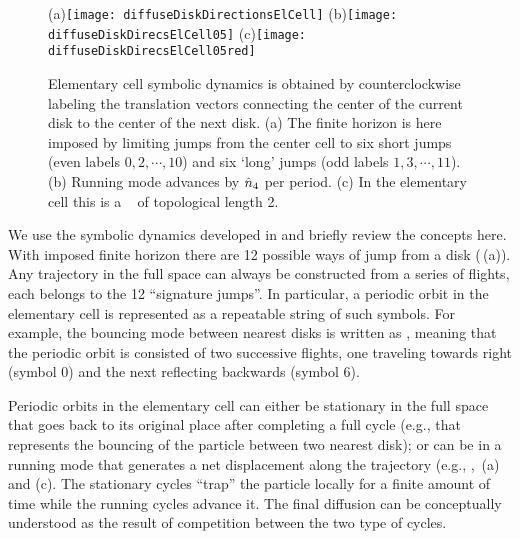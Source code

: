 

\begin{figure}
  \begin{center}
    (a)\texttt{[image: diffuseDiskDirectionsElCell]}
    (b)\texttt{[image: diffuseDiskDirecsElCell05]}
    (c)\texttt{[image: diffuseDiskDirecsElCell05red]}
  \end{center}
  \caption{\label{fig-diskDirectionsElCell}
  Elementary cell symbolic dynamics is obtained by counterclockwise
  labeling the translation vectors connecting the center of the current
  disk to the center of  the next disk. (a) The finite horizon is here
  imposed by limiting jumps from  the center cell to six short jumps
  (even labels $0, 2,\cdots,10$) and six `long' jumps (odd labels $1,
  3,\cdots,11$). (b) Running mode   advances by $\hat{n}_4$ per
  period. (c) In the elementary cell this is  a \po\  of
  topological length 2.
  }
\end{figure}

We use the symbolic dynamics developed in  and briefly
review the concepts here. With imposed finite horizon there are 12
possible ways of jump from a disk
(\,(a)). Any trajectory in the full
space can always be constructed from a series of flights, each belongs to
the 12 ``signature jumps''. In particular, a periodic orbit in the
elementary cell is represented as a repeatable string of such symbols.
For example, the bouncing mode between nearest disks is written as
, meaning that the periodic orbit is consisted of two
successive flights, one traveling towards right (symbol $0$) and the next
reflecting backwards (symbol $6$).

Periodic orbits in the elementary cell can either be stationary in the
full space that goes back to its original place after completing a full
cycle (e.g.,  that represents the bouncing of the particle
between two nearest disk); or can be in a running mode that generates a
net displacement along the trajectory (e.g., ,
\,(a) and (c). The stationary cycles
``trap'' the  particle locally for a finite amount of time while the
running cycles advance it. The final diffusion  can
be conceptually understood as the result of competition between the two
type of cycles.

